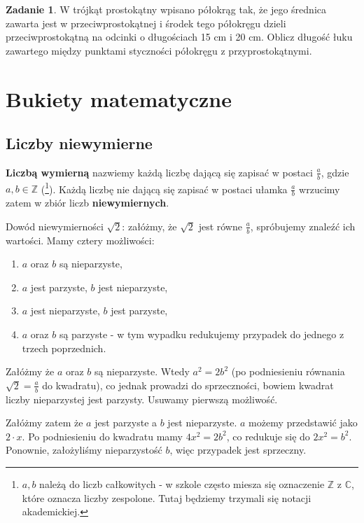 \documentclass[11pt]{article}
\theoremstyle{definition}
\newtheorem{zad}{Zadanie}
\numberwithin{zad}{section}
\begin{document}
\begin{zad}
W trójkąt prostokątny wpisano półokrąg tak, że jego średnica zawarta jest w przeciwprostokątnej i środek tego półokręgu dzieli przeciwprostokątną na odcinki o długościach 15 cm i 20 cm. Oblicz długość łuku zawartego między punktami styczności półokręgu z przyprostokątnymi.
\end{zad}

\section{Bukiety matematyczne}

\subsection{Liczby niewymierne}

\textbf{Liczbą wymierną} nazwiemy każdą liczbę dającą się zapisać w postaci $\frac ab$, gdzie $a, b\in\mathbb Z$ (\footnote{$a, b$ należą do liczb całkowitych - w szkole często miesza się oznaczenie $\mathbb Z$ z $\mathbb C$, które oznacza liczby zespolone. Tutaj będziemy trzymali się notacji akademickiej.}). Każdą liczbę nie dającą się zapisać w postaci ułamka $\frac ab$ wrzucimy zatem w zbiór liczb \textbf{niewymiernych}.

Dowód niewymierności $\sqrt2$: załóżmy, że $\sqrt2$ jest równe $\frac ab$, spróbujemy znaleźć ich wartości. Mamy cztery możliwości:

\begin{enumerate}
\item $a$ oraz $b$ są nieparzyste,
\item $a$ jest parzyste, $b$ jest nieparzyste,
\item $a$ jest nieparzyste, $b$ jest parzyste,
\item $a$ oraz $b$ są parzyste - w tym wypadku redukujemy przypadek do jednego z trzech poprzednich.
\end{enumerate}

Załóżmy że $a$ oraz $b$ są nieparzyste. Wtedy $a^2 = 2b^2$ (po podniesieniu równania $\sqrt 2 = \frac ab$ do kwadratu), co jednak prowadzi do sprzeczności, bowiem kwadrat liczby nieparzystej jest parzysty. Usuwamy pierwszą możliwość.

Załóżmy zatem że $a$ jest parzyste a $b$ jest nieparzyste. $a$ możemy przedstawić jako $2\cdot x$. Po podniesieniu do kwadratu mamy $4x^2 = 2b^2$, co redukuje się do $2x^2=b^2$. Ponownie, założyliśmy nieparzystość $b$, więc przypadek jest sprzeczny.
\end{document}
